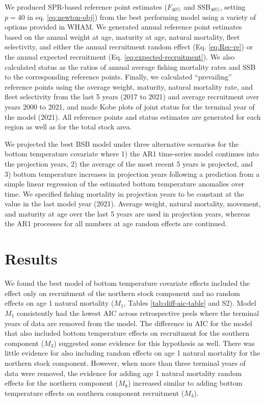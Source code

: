 \documentclass[
]{article}
\begin{document}
We produced SPR-based reference point estimates (\(F_{40\%}\) and SSB\(_{40\%}\), setting \(p=40\) in eq. \ref{eq:newton-obj}) from the best performing model using a variety of options provided in WHAM. We generated annual reference point estimates based on the annual weight at age, maturity at age, natural mortality, fleet selectivity, and either the annual recruitment random effect (Eq. \ref{eq:Rec-re}) or the annual expected recruitment (Eq. \ref{eq:expected-recruitment}). We also calculated status as the ratios of annual average fishing mortality rates and SSB to the corresponding reference points. Finally, we calculated ``prevailing'' reference points using the average weight, maturity, natural mortality rate, and fleet selectivity from the last 5 years (2017 to 2021) and average recruitment over years 2000 to 2021, and made Kobe plots of joint status for the terminal year of the model (2021). All reference points and status estimates are generated for each region as well as for the total stock area.

We projected the best BSB model under three alternative scenarios for the bottom temperature covariate where 1) the AR1 time-series model continues into the projection years, 2) the average of the most recent 5 years is projected, and 3) bottom temperature increases in projection years following a prediction from a simple linear regression of the estimated bottom temperature anomalies over time. We specified fishing mortality in projection years to be constant at the value in the last model year (2021). Average weight, natural mortality, movement, and maturity at age over the last 5 years are used in projection years, whereas the AR1 processes for all numbers at age random effects are continued.

\hypertarget{results}{%
\section*{Results}\label{results}}

We found the best model of bottom temperature covariate effects included the effect only on recruitment of the northern stock component and no random effects on age 1 natural mortality (\(M_1\), Tables \ref{tab:diff-aic-table} and S2). Model \(M_1\) consistently had the lowest AIC across retrospective peels where the terminal years of data are removed from the model. The difference in AIC for the model that also included bottom temperature effects on recruitment for the southern component (\(M_3\)) suggested some evidence for this hypothesis as well. There was little evidence for also including random effects on age 1 natural mortality for the northern stock component. However, when more than three terminal years of data were removed, the evidence for adding age 1 natural mortality random effects for the northern component (\(M_8\)) increased similar to adding bottom temperature effects on southern component recruitment (\(M_3\)).
\end{document}
